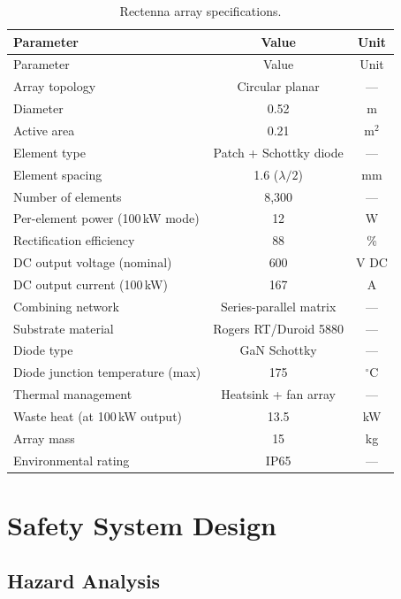 \documentclass[11pt,a4paper]{article}
\begin{document}
\begin{longtable}{lcc}
\caption{Rectenna array specifications.} \\
\toprule
Parameter & Value & Unit \\
\midrule
\endfirsthead
\toprule
Parameter & Value & Unit \\
\midrule
\endhead
\bottomrule
\endlastfoot
Array topology & Circular planar & --- \\
Diameter & 0.52 & m \\
Active area & 0.21 & m$^2$ \\
Element type & Patch + Schottky diode & --- \\
Element spacing & 1.6 ($\lambda/2$) & mm \\
Number of elements & 8{,}300 & --- \\
Per-element power (100\,kW mode) & 12 & W \\
Rectification efficiency & 88 & \% \\
DC output voltage (nominal) & 600 & V DC \\
DC output current (100\,kW) & 167 & A \\
Combining network & Series-parallel matrix & --- \\
Substrate material & Rogers RT/Duroid 5880 & --- \\
Diode type & GaN Schottky & --- \\
Diode junction temperature (max) & 175 & $^\circ$C \\
Thermal management & Heatsink + fan array & --- \\
Waste heat (at 100\,kW output) & 13.5 & kW \\
Array mass & 15 & kg \\
Environmental rating & IP65 & --- \\
\end{longtable}

\section{Safety System Design}

\subsection{Hazard Analysis}
\end{document}
